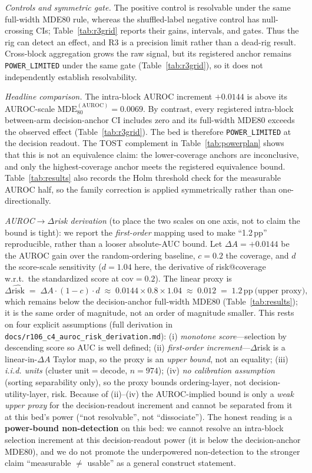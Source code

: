 \documentclass{article}
\begin{document}
\emph{Controls and symmetric gate.} The positive control is resolvable under the same
full-width MDE80 rule, whereas the shuffled-label negative control has null-crossing CIs;
Table~\ref{tab:r3grid} reports their gains, intervals, and gates. Thus the rig can detect
an effect, and R3 is a precision limit rather than a dead-rig result. Cross-block aggregation
grows the raw signal, but its registered anchor remains \texttt{POWER\_LIMITED} under the
same gate (Table~\ref{tab:r3grid}), so it does not independently
establish resolvability.

\emph{Headline comparison.} The intra-block AUROC increment $+0.0144$ is above its
AUROC-scale $\mathrm{MDE}_{80}^{(\mathrm{AUROC})}{=}0.0069$. By contrast, every registered
intra-block between-arm decision-anchor CI includes zero and its full-width MDE80 exceeds the
observed effect (Table~\ref{tab:r3grid}). The bed is therefore
\texttt{POWER\_LIMITED} at the decision readout. The TOST complement in
Table~\ref{tab:powerplan} shows that this is not an equivalence claim: the lower-coverage
anchors are inconclusive, and only the highest-coverage anchor meets the registered
equivalence bound. Table~\ref{tab:results} also records the Holm threshold check for the
measurable AUROC half, so the family correction is applied symmetrically rather than
one-directionally.

\emph{AUROC$\rightarrow\Delta$risk
derivation} (to place the two scales on one axis, not to claim the bound is tight): we
report the \emph{first-order} mapping used to make ``1.2\,pp'' reproducible, rather than a
looser absolute-AUC bound. Let $\Delta A{=}+0.0144$ be the AUROC gain over the
random-ordering baseline, $c{=}0.2$ the coverage, and $d$ the score-scale sensitivity
($d{=}1.04$ here, the derivative of risk@coverage w.r.t.\ the standardized score at
cov$=0.2$). The linear proxy is
\[
  \Delta\hat{\mathrm{risk}} \;=\; \Delta A\cdot(1-c)\cdot d
  \;\approx\; 0.0144\times 0.8\times 1.04 \;\approx\; 0.012 \;=\; 1.2\,\mathrm{pp}\ \text{(upper proxy)},
\]
which remains below the decision-anchor full-width MDE80 (Table~\ref{tab:results}); it is
the same order of magnitude, not an order of magnitude smaller. This rests on four explicit
assumptions (full derivation in
\texttt{docs/r106\_c4\_auroc\_risk\_derivation.md}): (i) \emph{monotone score}---selection by
descending score so AUC is well defined; (ii) \emph{first-order increment}---$\Delta$risk is
a linear-in-$\Delta A$ Taylor map, so the proxy is an \emph{upper bound}, not an equality;
(iii) \emph{i.i.d. units} (cluster unit$=$decode, $n{=}974$); (iv) \emph{no calibration
assumption} (sorting separability only), so the proxy bounds ordering-layer, not
decision-utility-layer, risk. Because of (ii)--(iv) the AUROC-implied bound is only a
\emph{weak upper proxy} for the decision-readout increment and cannot be separated from it
at this bed's power (``not resolvable'', not ``dissociate''). The honest reading is a
\textbf{power-bound non-detection} on this bed: we cannot resolve an intra-block selection
increment at this decision-readout power (it is below the decision-anchor MDE80), and we do
not promote the underpowered non-detection to the stronger claim ``measurable $\neq$ usable''
as a general construct statement.
\end{document}
